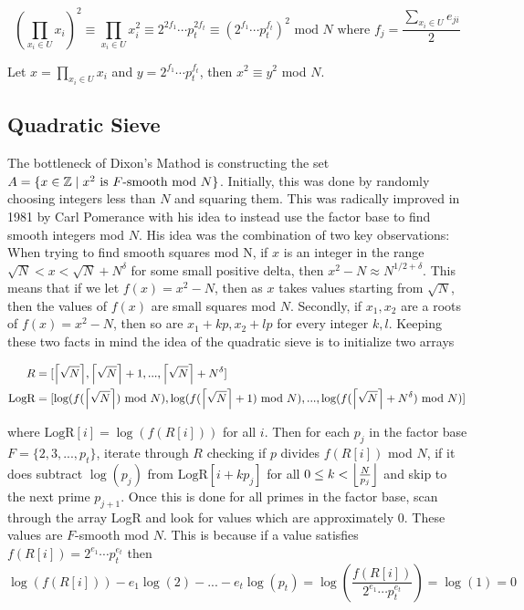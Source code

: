   $$
  (\prod_{x_i \in U}x_i)^2 \equiv \prod_{x_i \in U}x_i^2 \equiv 2^{2f_1} \cdots p_t^{2f_t} \equiv (2^{f_1} \cdots p_t^{f_t})^2 \text{ mod } N \text{ where } f_j = \frac{\sum_{x_i \in U} e_{ji}}{2} 
  $$

  Let $x= \prod_{x_i \in U}x_i $ and $y = 2^{f_1} \cdots p_t^{f_t}$, then $x^2 \equiv y^2$ mod $N$. 

\subsection{Quadratic Sieve}
  The bottleneck of Dixon's Mathod is constructing the set $A = \lbrace x \in \Z \mid x^2 \text{ is }F\text{-smooth mod } N \rbrace$. Initially, this was done by randomly choosing integers less than $N$ and squaring them. This was radically improved in 1981 by Carl Pomerance with his idea to instead use the factor base to find smooth integers mod $N$. His idea was the combination of two key observations: When trying to find smooth squares mod N, if $x$ is an integer in the range $\sqrt{N} < x < \sqrt{N} + N^\delta $ for some small positive delta, then $x^2 - N \approx N^{1/2 + \delta}$. This means that if we let $f(x) = x^2 - N $, then as $x$ takes values starting from $\sqrt{N}$, then the values of $f(x)$ are small squares mod $N$. Secondly, if $x_1,x_2$ are a roots of $f(x)= x^2 - N$, then so are $x_1 + kp,x_2 + lp$ for every integer $k,l$. Keeping these two facts in mind the idea of the quadratic sieve is to initialize two arrays

  \begin{align*}
    R &= [\ceil*{{\sqrt{N}}},\ceil*{{\sqrt{N}}}+ 1, ..., \ceil*{\sqrt{N}} + N^\delta] \\
    \text{LogR} &= [\log(f(\ceil*{\sqrt{N}}) \text{ mod } N), \log(f(\ceil*{\sqrt{N}}+1) \text{ mod } N),..., \log(f(\ceil*{\sqrt{N}}  + N^\delta) \text{ mod } N)] 
  \end{align*}

  where $\text{LogR}[i] = \log(f(R[i]))$ for all $i$. Then for each $p_j$ in the factor base $F = \lbrace 2,3,...,p_t \rbrace $, iterate through $R$ checking if $p$ divides $f(R[i])$ mod $N$, if it does subtract $\log(p_j)$ from $\text{LogR}[i + kp_j]$ for all $0 \leq k < \floor*{\frac{N}{p_j}}$ and skip to the next prime $p_{j+1}$. Once this is done for all primes in the factor base, scan through the array LogR and look for values which are approximately $0$. These values are $F$-smooth mod $N$. This is because if a value satisfies $f(R[i]) = 2^{e_1} \cdots p_t^{e_t}$ then 
  $$ 
    \log(f(R[i])) - e_1\log(2) - ... - e_t \log(p_t) = \log(\frac{f(R[i])}{2^{e_1} \cdots p_t^{e_t}}) = \log(1) = 0
  $$

